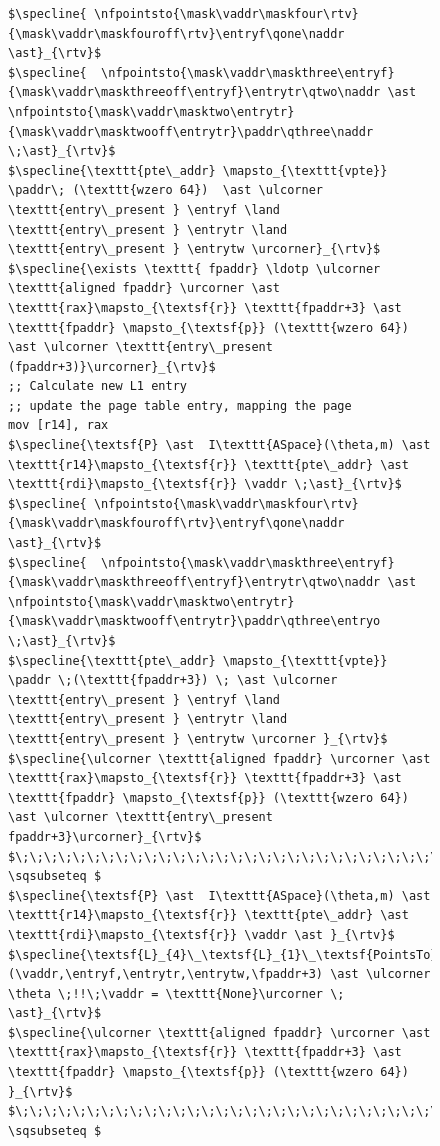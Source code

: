 \documentclass[acmsmall,screen,nonacm]{acmart}
\newcommand{\naddr}{\kw{a}}
\newcommand{\vaddr}{\kw{va}}
\newcommand{\nfpointsto}[5]{#1\sim#2 \mapsto_{#5}\{#4\}\;#3}
\newcommand{\maskfour}{\textsf{l4M52}}
\newcommand{\maskfouroff}{\textsf{l4off}}
\newcommand{\maskthree}{\textsf{l3M52}}
\newcommand{\maskthreeoff}{\textsf{l3off}}
\newcommand{\masktwo}{\textsf{l2M52}}
\newcommand{\masktwooff}{\textsf{l2off}}
\newcommand{\mask}[3]{(#2\; #1 \; #3)}
\newcommand{\entryf}{\textsf{l4e}}
\newcommand{\entrytr}{\textsf{l3e}}
\newcommand{\entrytw}{\textsf{l2e}}
\newcommand{\entryo}{\textsf{l1e}}
\newcommand{\paddr}{\textsf{pa}}
\newcommand{\kw}[1]{\mathsf{#1}}
\begin{document}
\begin{figure}
\begin{lstlisting}
$\specline{ \nfpointsto{\mask\vaddr\maskfour\rtv}{\mask\vaddr\maskfouroff\rtv}\entryf\qone\naddr \ast}_{\rtv}$ 
$\specline{  \nfpointsto{\mask\vaddr\maskthree\entryf}{\mask\vaddr\maskthreeoff\entryf}\entrytr\qtwo\naddr \ast \nfpointsto{\mask\vaddr\masktwo\entrytr}{\mask\vaddr\masktwooff\entrytr}\paddr\qthree\naddr \;\ast}_{\rtv}$
$\specline{\texttt{pte\_addr} \mapsto_{\texttt{vpte}} \paddr\; (\texttt{wzero 64})  \ast \ulcorner \texttt{entry\_present } \entryf \land \texttt{entry\_present } \entrytr \land  \texttt{entry\_present } \entrytw \urcorner}_{\rtv}$
$\specline{\exists \texttt{ fpaddr} \ldotp \ulcorner \texttt{aligned fpaddr} \urcorner \ast \texttt{rax}\mapsto_{\textsf{r}} \texttt{fpaddr+3} \ast \texttt{fpaddr} \mapsto_{\textsf{p}} (\texttt{wzero 64}) \ast \ulcorner \texttt{entry\_present (fpaddr+3)}\urcorner}_{\rtv}$
;; Calculate new L1 entry
;; update the page table entry, mapping the page
mov [r14], rax
$\specline{\textsf{P} \ast  I\texttt{ASpace}(\theta,m) \ast  \texttt{r14}\mapsto_{\textsf{r}} \texttt{pte\_addr} \ast \texttt{rdi}\mapsto_{\textsf{r}} \vaddr \;\ast}_{\rtv}$
$\specline{ \nfpointsto{\mask\vaddr\maskfour\rtv}{\mask\vaddr\maskfouroff\rtv}\entryf\qone\naddr \ast}_{\rtv}$ 
$\specline{  \nfpointsto{\mask\vaddr\maskthree\entryf}{\mask\vaddr\maskthreeoff\entryf}\entrytr\qtwo\naddr \ast \nfpointsto{\mask\vaddr\masktwo\entrytr}{\mask\vaddr\masktwooff\entrytr}\paddr\qthree\entryo \;\ast}_{\rtv}$
$\specline{\texttt{pte\_addr} \mapsto_{\texttt{vpte}} \paddr \;(\texttt{fpaddr+3}) \; \ast \ulcorner \texttt{entry\_present } \entryf \land \texttt{entry\_present } \entrytr \land  \texttt{entry\_present } \entrytw \urcorner }_{\rtv}$
$\specline{\ulcorner \texttt{aligned fpaddr} \urcorner \ast \texttt{rax}\mapsto_{\textsf{r}} \texttt{fpaddr+3} \ast \texttt{fpaddr} \mapsto_{\textsf{p}} (\texttt{wzero 64}) \ast \ulcorner \texttt{entry\_present fpaddr+3}\urcorner}_{\rtv}$
$\;\;\;\;\;\;\;\;\;\;\;\;\;\;\;\;\;\;\;\;\;\;\;\;\;\;\;\;\;\;\;\;\;\;\;\;\;\;\;\;\;\;\;\; \sqsubseteq $
$\specline{\textsf{P} \ast  I\texttt{ASpace}(\theta,m) \ast  \texttt{r14}\mapsto_{\textsf{r}} \texttt{pte\_addr} \ast \texttt{rdi}\mapsto_{\textsf{r}} \vaddr \ast }_{\rtv}$
$\specline{\textsf{L}_{4}\_\textsf{L}_{1}\_\textsf{PointsTo}(\vaddr,\entryf,\entrytr,\entrytw,\fpaddr+3) \ast \ulcorner \theta \;!!\;\vaddr = \texttt{None}\urcorner \; \ast}_{\rtv}$
$\specline{\ulcorner \texttt{aligned fpaddr} \urcorner \ast \texttt{rax}\mapsto_{\textsf{r}} \texttt{fpaddr+3} \ast \texttt{fpaddr} \mapsto_{\textsf{p}} (\texttt{wzero 64}) }_{\rtv}$
$\;\;\;\;\;\;\;\;\;\;\;\;\;\;\;\;\;\;\;\;\;\;\;\;\;\;\;\;\;\;\;\;\;\;\;\;\;\;\;\;\;\;\;\; \sqsubseteq $

\end{lstlisting}
\end{figure}
\end{document}
